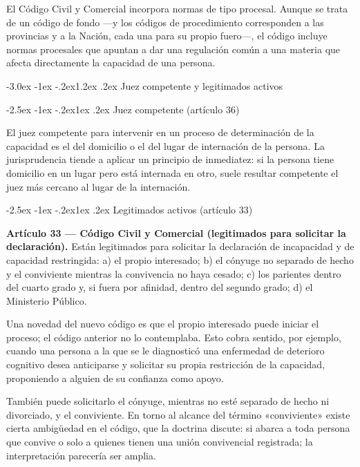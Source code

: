 \documentclass[12pt,oneside]{book}
\makeatletter
\renewcommand\section{\@startsection{section}{1}{\z@}%
  {-3.0ex \@plus -1ex \@minus -.2ex}{1.2ex \@plus .2ex}%
  {\normalfont\large\bfseries\color{acento}}}
\renewcommand\subsection{\@startsection{subsection}{2}{\z@}%
  {-2.5ex \@plus -1ex \@minus -.2ex}{1ex \@plus .2ex}%
  {\normalfont\normalsize\bfseries}}
\makeatother
\begin{document}
El Código Civil y Comercial incorpora normas de tipo procesal. Aunque se trata de un código de fondo ---y los códigos de procedimiento corresponden a las provincias y a la Nación, cada una para su propio fuero---, el código incluye normas procesales que apuntan a dar una regulación común a una materia que afecta directamente la capacidad de una persona.

\section{Juez competente y legitimados activos}

\subsection{Juez competente (artículo 36)}

El juez competente para intervenir en un proceso de determinación de la capacidad es el del domicilio o el del lugar de internación de la persona. La jurisprudencia tiende a aplicar un principio de inmediatez: si la persona tiene domicilio en un lugar pero está internada en otro, suele resultar competente el juez más cercano al lugar de la internación.

\subsection{Legitimados activos (artículo 33)}

\begin{importante}
\textbf{Artículo 33 --- Código Civil y Comercial (legitimados para solicitar la declaración).} Están legitimados para solicitar la declaración de incapacidad y de capacidad restringida: a) el propio interesado; b) el cónyuge no separado de hecho y el conviviente mientras la convivencia no haya cesado; c) los parientes dentro del cuarto grado y, si fuera por afinidad, dentro del segundo grado; d) el Ministerio Público.
\end{importante}

Una novedad del nuevo código es que el propio interesado puede iniciar el proceso; el código anterior no lo contemplaba. Esto cobra sentido, por ejemplo, cuando una persona a la que se le diagnosticó una enfermedad de deterioro cognitivo desea anticiparse y solicitar su propia restricción de la capacidad, proponiendo a alguien de su confianza como apoyo.

También puede solicitarlo el cónyuge, mientras no esté separado de hecho ni divorciado, y el conviviente. En torno al alcance del término «conviviente» existe cierta ambigüedad en el código, que la doctrina discute: si abarca a toda persona que convive o solo a quienes tienen una unión convivencial registrada; la interpretación parecería ser amplia.
\end{document}

